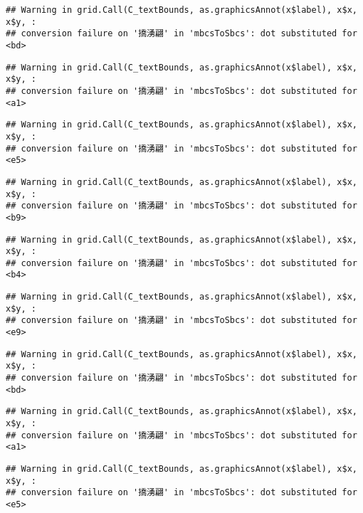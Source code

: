 \documentclass[
]{article}
\begin{document}
\begin{verbatim}
## Warning in grid.Call(C_textBounds, as.graphicsAnnot(x$label), x$x, x$y, :
## conversion failure on '撟湧翩' in 'mbcsToSbcs': dot substituted for <bd>
\end{verbatim}

\begin{verbatim}
## Warning in grid.Call(C_textBounds, as.graphicsAnnot(x$label), x$x, x$y, :
## conversion failure on '撟湧翩' in 'mbcsToSbcs': dot substituted for <a1>
\end{verbatim}

\begin{verbatim}
## Warning in grid.Call(C_textBounds, as.graphicsAnnot(x$label), x$x, x$y, :
## conversion failure on '撟湧翩' in 'mbcsToSbcs': dot substituted for <e5>
\end{verbatim}

\begin{verbatim}
## Warning in grid.Call(C_textBounds, as.graphicsAnnot(x$label), x$x, x$y, :
## conversion failure on '撟湧翩' in 'mbcsToSbcs': dot substituted for <b9>
\end{verbatim}

\begin{verbatim}
## Warning in grid.Call(C_textBounds, as.graphicsAnnot(x$label), x$x, x$y, :
## conversion failure on '撟湧翩' in 'mbcsToSbcs': dot substituted for <b4>
\end{verbatim}

\begin{verbatim}
## Warning in grid.Call(C_textBounds, as.graphicsAnnot(x$label), x$x, x$y, :
## conversion failure on '撟湧翩' in 'mbcsToSbcs': dot substituted for <e9>
\end{verbatim}

\begin{verbatim}
## Warning in grid.Call(C_textBounds, as.graphicsAnnot(x$label), x$x, x$y, :
## conversion failure on '撟湧翩' in 'mbcsToSbcs': dot substituted for <bd>
\end{verbatim}

\begin{verbatim}
## Warning in grid.Call(C_textBounds, as.graphicsAnnot(x$label), x$x, x$y, :
## conversion failure on '撟湧翩' in 'mbcsToSbcs': dot substituted for <a1>
\end{verbatim}

\begin{verbatim}
## Warning in grid.Call(C_textBounds, as.graphicsAnnot(x$label), x$x, x$y, :
## conversion failure on '撟湧翩' in 'mbcsToSbcs': dot substituted for <e5>
\end{verbatim}
\end{document}
